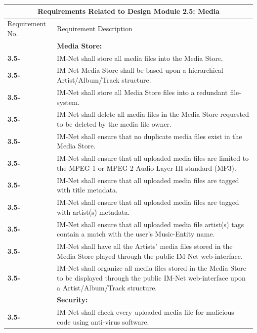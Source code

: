 \documentclass[letterpaper,12pt]{article}
\newcounter{rcounter}							%
\newcommand\rnumber{\stepcounter{rcounter}\arabic{rcounter}}
\begin{document}
{\begin{center}
\begin{tabular}{|l|p{6in}|}
\end{tabular} 
\end{center}

\setcounter{rcounter}{0}
\begin{center}
\begin{tabular}{|l|p{6in}|}
\hline 
\multicolumn{2}{|c|}{\textbf{Requirements Related to Design Module 2.5: Media}} \\ 
\hline 
Requirement No. & Requirement Description \\
\hline
& \textbf{Media Store:} \\
\hline
\textbf{3.5-\rnumber} & IM-Net shall store all media files into the Media Store. \\ 
\hline
\textbf{3.5-\rnumber} & IM-Net Media Store shall be based upon a hierarchical Artist/Album/Track structure. \\
\hline
\textbf{3.5-\rnumber} & IM-Net shall store all Media Store files into a redundant file-system. \\ 
\hline
\textbf{3.5-\rnumber} & IM-Net shall delete all media files in the Media Store requested to be deleted by the media file owner. \\ 
\hline
\textbf{3.5-\rnumber} & IM-Net shall ensure that no duplicate media files exist in the Media Store. \\ 
\hline
\textbf{3.5-\rnumber} & IM-Net shall ensure that all uploaded media files are limited to the MPEG-1 or MPEG-2 Audio Layer III standard (MP3). \\ 
\hline
\textbf{3.5-\rnumber} & IM-Net shall ensure that all uploaded media files are tagged with title metadata. \\ 
\hline
\textbf{3.5-\rnumber} & IM-Net shall ensure that all uploaded media files are tagged with artist(s) metadata. \\ 
\hline
\textbf{3.5-\rnumber} & IM-Net shall ensure that all uploaded media file artist(s) tags contain a match with the user's Music-Entity name. \\ 
\hline
\textbf{3.5-\rnumber} & IM-Net shall have all the Artists' media files stored in the Media Store played through the public IM-Net web-interface. \\ 
\hline
\textbf{3.5-\rnumber} & IM-Net shall organize all media files stored in the Media Store to be displayed through the public IM-Net web-interface upon a Artist/Album/Track structure. \\ 
\hline
& \textbf{Security:} \\
\hline
\textbf{3.5-\rnumber} & IM-Net shall check every uploaded media file for malicious code using anti-virus software. \\ 

\end{tabular}
\end{center}}
\end{document}
